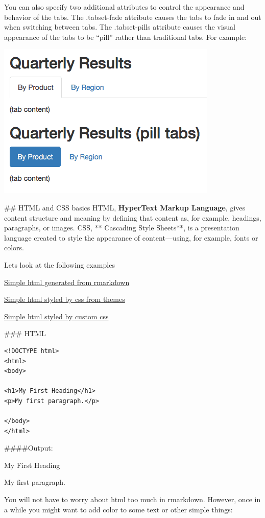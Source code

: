 \documentclass[
]{book}
\begin{document}
You can also specify two additional attributes to control the appearance and behavior of the tabs. The .tabset-fade attribute causes the tabs to fade in and out when switching between tabs. The .tabset-pills attribute causes the visual appearance of the tabs to be ``pill'' rather than traditional tabs. For example:

\includegraphics{img/tabset.png}

\#\# HTML and CSS basics
HTML, \textbf{HyperText Markup Language}, gives content structure and meaning by defining that content as, for example, headings, paragraphs, or images. CSS, ** Cascading Style Sheets**, is a presentation language created to style the appearance of content---using, for example, fonts or colors.

Lets look at the following examples

\href{data/case_study_default.html}{Simple html generated from rmarkdown}

\href{data/case_study_theme.html}{Simple html styled by css from themes}

\href{data/case_study_extreme.html}{Simple html styled by custom css}

\#\#\# HTML

\begin{verbatim}
<!DOCTYPE html>
<html>
<body>

<h1>My First Heading</h1>
<p>My first paragraph.</p>

</body>
</html>
\end{verbatim}

\#\#\#\#Output:

My First Heading

My first paragraph.

You will not have to worry about html too much in rmarkdown. However,
once in a while you might want to add color to some text or other simple things:
\end{document}
